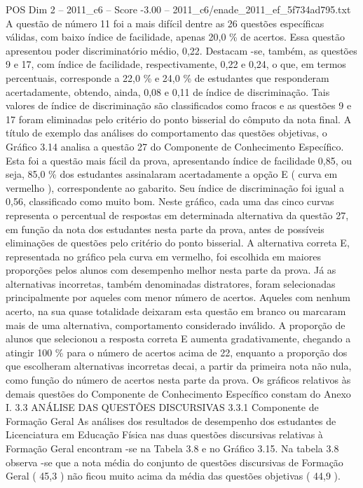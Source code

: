 \begin{textsample}{POS Dim 2 – 2011\_c6 – Score -3.00 – 2011\_c6/enade\_2011\_ef\_5f734ad795.txt}
A questão de número 11 foi a mais difícil dentre as 26 questões específicas válidas, com baixo índice de facilidade, apenas 20,0 \% de acertos.
Essa questão apresentou poder discriminatório médio, 0,22.
Destacam -se, também, as questões 9 e 17, com índice de facilidade, respectivamente, 0,22 e 0,24, o que, em termos percentuais, corresponde a 22,0 \% e 24,0 \% de estudantes que responderam acertadamente, obtendo, ainda, 0,08 e 0,11 de índice de discriminação.
Tais valores de índice de discriminação são classificados como fracos e as questões 9 e 17 foram eliminadas pelo critério do ponto bisserial do cômputo da nota final.
A título de exemplo das análises do comportamento das questões objetivas, o Gráfico 3.14 analisa a questão 27 do Componente de Conhecimento Específico.
Esta foi a questão mais fácil da prova, apresentando índice de facilidade 0,85, ou seja, 85,0 \% dos estudantes assinalaram acertadamente a opção E ( curva em vermelho ), correspondente ao gabarito.
Seu índice de discriminação foi igual a 0,56, classificado como muito bom.
Neste gráfico, cada uma das cinco curvas representa o percentual de respostas em determinada alternativa da questão 27, em função da nota dos estudantes nesta parte da prova, antes de possíveis eliminações de questões pelo critério do ponto bisserial.
A alternativa correta E, representada no gráfico pela curva em vermelho, foi escolhida em maiores proporções pelos alunos com desempenho melhor nesta parte da prova.
Já as alternativas incorretas, também denominadas distratores, foram selecionadas principalmente por aqueles com menor número de acertos.
Aqueles com nenhum acerto, na sua quase totalidade deixaram esta questão em branco ou marcaram mais de uma alternativa, comportamento considerado inválido.
A proporção de alunos que selecionou a resposta correta E aumenta gradativamente, chegando a atingir 100 \% para o número de acertos acima de 22, enquanto a proporção dos que escolheram alternativas incorretas decai, a partir da primeira nota não nula, como função do número de acertos nesta parte da prova.
Os gráficos relativos às demais questões do Componente de Conhecimento Específico constam do Anexo I. 3.3 ANÁLISE DAS QUESTÕES DISCURSIVAS 3.3.1 Componente de Formação Geral As análises dos resultados de desempenho dos estudantes de Licenciatura em Educação Física nas duas questões discursivas relativas à Formação Geral encontram -se na Tabela 3.8 e no Gráfico 3.15.
Na tabela 3.8 observa -se que a nota média do conjunto de questões discursivas de Formação Geral ( 45,3 ) não ficou muito acima da média das questões objetivas ( 44,9 ).

\end{textsample}
